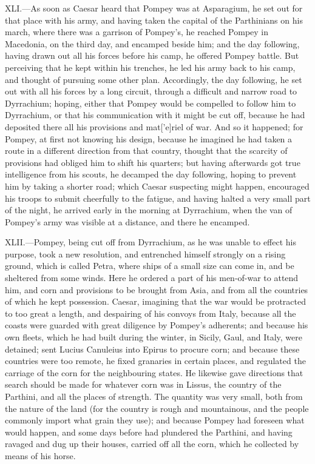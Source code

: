 XLI.—As soon as Caesar heard that Pompey was at Asparagium, he set out
for that place with his army, and having taken the capital of the
Parthinians on his march, where there was a garrison of Pompey's, he
reached Pompey in Macedonia, on the third day, and encamped beside him;
and the day following, having drawn out all his forces before his camp,
he offered Pompey battle. But perceiving that he kept within his
trenches, he led his army back to his camp, and thought of pursuing some
other plan. Accordingly, the day following, he set out with all his
forces by a long circuit, through a difficult and narrow road to
Dyrrachium; hoping, either that Pompey would be compelled to follow him
to Dyrrachium, or that his communication with it might be cut off,
because he had deposited there all his provisions and mat['e]riel of
war. And so it happened; for Pompey, at first not knowing his design,
because he imagined he had taken a route in a different direction from
that country, thought that the scarcity of provisions had obliged him to
shift his quarters; but having afterwards got true intelligence from his
scouts, he decamped the day following, hoping to prevent him by taking a
shorter road; which Caesar suspecting might happen, encouraged his
troops to submit cheerfully to the fatigue, and having halted a very
small part of the night, he arrived early in the morning at Dyrrachium,
when the van of Pompey's army was visible at a distance, and there he
encamped.

XLII.—Pompey, being cut off from Dyrrachium, as he was unable to effect
his purpose, took a new resolution, and entrenched himself strongly on a
rising ground, which is called Petra, where ships of a small size can
come in, and be sheltered from some winds. Here he ordered a part of his
men-of-war to attend him, and corn and provisions to be brought from
Asia, and from all the countries of which he kept possession. Caesar,
imagining that the war would be protracted to too great a length, and
despairing of his convoys from Italy, because all the coasts were
guarded with great diligence by Pompey's adherents; and because his own
fleets, which he had built during the winter, in Sicily, Gaul, and
Italy, were detained; sent Lucius Canuleius into Epirus to procure corn;
and because these countries were too remote, he fixed granaries in
certain places, and regulated the carriage of the corn for the
neighbouring states. He likewise gave directions that search should be
made for whatever corn was in Lissus, the country of the Parthini, and
all the places of strength. The quantity was very small, both from the
nature of the land (for the country is rough and mountainous, and the
people commonly import what grain they use); and because Pompey had
foreseen what would happen, and some days before had plundered the
Parthini, and having ravaged and dug up their houses, carried off all
the corn, which he collected by means of his horse.

